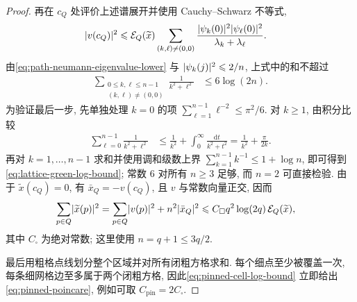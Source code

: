 \documentclass{ctexart}
\newcommand{\ti}[1]{\widetilde{#1}}
\renewcommand{\ge}{\geqslant}
\renewcommand{\le}{\leqslant}
\DeclarePairedDelimiter\abs{\lvert}{\rvert}
\begin{document}
\begin{proof}
再在 $c_Q$ 处评价上述谱展开并使用 Cauchy--Schwarz 不等式,
\begin{align}
    \abs{v(c_Q)}^2
    &\le \mathcal E_Q(\ti x)
      \sum_{(k,\ell)\ne(0,0)}
      \frac{\abs{\psi_k(0)}^2\abs{\psi_\ell(0)}^2}
      {\lambda_k+\lambda_\ell}.
    \label{eq:cell-point-evaluation-spectral}
\end{align}
由\cref{eq:path-neumann-eigenvalue-lower} 与 $\abs{\psi_k(j)}^2\le2/n$, 上式中的和不超过
\begin{align}
    \sum_{\substack{0\le k,\ell\le n-1\\(k,\ell)\ne(0,0)}}
      \frac1{k^2+\ell^2}
    &\le 6\log(2n).
    \label{eq:lattice-green-log-bound}
\end{align}
为验证最后一步, 先单独处理 $k=0$ 的项
$\sum_{\ell=1}^{n-1}\ell^{-2}\le\pi^2/6$. 对 $k\ge1$,
由积分比较
\begin{align}
    \sum_{\ell=0}^{n-1}\frac1{k^2+\ell^2}
    &\le \frac1{k^2}+\int_0^\infty\frac{\mathrm dt}{k^2+t^2}
     =\frac1{k^2}+\frac\pi{2k}.
    \label{eq:lattice-green-row-bound}
\end{align}
再对 $k=1,\ldots,n-1$ 求和并使用调和级数上界
$\sum_{k=1}^{n-1}k^{-1}\le1+\log n$, 即可得到
\cref{eq:lattice-green-log-bound}; 常数 $6$ 对所有 $n\ge3$ 足够, 而 $n=2$ 可直接检验. 由于 $\ti x(c_Q)=0$, 有 $\bar x_Q=-v(c_Q)$, 且 $v$ 与常数向量正交, 因而
\begin{align}
    \sum_{p\in Q}\abs{\ti x(p)}^2
    &=\sum_{p\in Q}\abs{v(p)}^2+n^2\abs{\bar x_Q}^2
    \le C_\square q^2\log(2q)\,\mathcal E_Q(\ti x),
    \label{eq:pinned-cell-log-bound}
\end{align}
其中 $C_\square$ 为绝对常数; 这里使用 $n=q+1\le3q/2$.

最后用粗格点线划分整个区域并对所有闭粗方格求和. 每个细点至少被覆盖一次, 每条细网格边至多属于两个闭粗方格, 因此\cref{eq:pinned-cell-log-bound} 立即给出\cref{eq:pinned-poincare}, 例如可取 $C_{\mathrm{pin}}=2C_\square$.
\end{proof}
\end{document}
